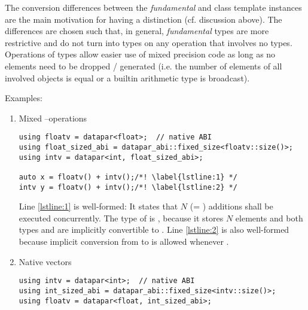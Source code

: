 The conversion differences between the \textit{fundamental} and \fixedsize class template instances are the main motivation for having a distinction (cf. discussion above).
The differences are chosen such that, in general, \textit{fundamental} types are more restrictive and do not turn into \fixedsize types on any operation that involves no \fixedsize types.
Operations of \fixedsize types allow easier use of mixed precision code as long as no elements need to be dropped / generated (i.e. the number of elements of all involved \datapar objects is equal or a builtin arithmetic type is broadcast).

Examples:

\begin{enumerate}
  \item Mixed \intt--\float operations
\smallskip\begin{lstlisting}[style=Vc]
using floatv = datapar<float>;  // native ABI
using float_sized_abi = datapar_abi::fixed_size<floatv::size()>;
using intv = datapar<int, float_sized_abi>;

auto x = floatv() + intv();/*! \label{lstline:1} */
intv y = floatv() + intv();/*! \label{lstline:2} */
\end{lstlisting}
    Line \ref{lstline:1} is well-formed:
    It states that $N$ (= ) additions shall be executed concurrently.
    The type of  is \datapar[<\float{}>], because it stores $N$ elements and both types  and  are implicitly convertible to \datapar[<\float{}>].
    Line \ref{lstline:2} is also well-formed because implicit conversion from  to  is allowed whenever .

  \item Native \intt vectors
\smallskip\begin{lstlisting}[style=Vc]
using intv = datapar<int>;  // native ABI
using int_sized_abi = datapar_abi::fixed_size<intv::size()>;
using floatv = datapar<float, int_sized_abi>;


\end{lstlisting}
\end{enumerate}
